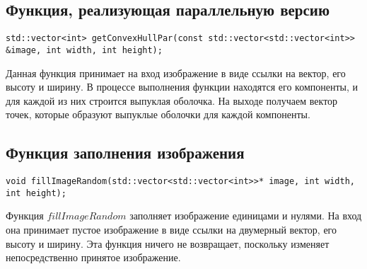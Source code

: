 \subsection{Функция, реализующая параллельную версию}
\begin{verbatim}
std::vector<int> getConvexHullPar(const std::vector<std::vector<int>> &image, int width, int height);
\end{verbatim}
Данная функция принимает на вход изображение в виде ссылки на вектор, его высоту и ширину. В процессе выполнения функции находятся его компоненты, и для каждой из них строится выпуклая оболочка. На выходе получаем вектор точек, которые образуют выпуклые оболочки для каждой компоненты.

\subsection{Функция заполнения изображения}
\begin{verbatim}
void fillImageRandom(std::vector<std::vector<int>>* image, int width, int height);
\end{verbatim}
Функция $fillImageRandom$ заполняет изображение единицами и нулями. На вход она принимает пустое изображение в виде ссылки на двумерный вектор, его высоту и ширину. Эта функция ничего не возвращает, поскольку изменяет непосредственно принятое изображение.